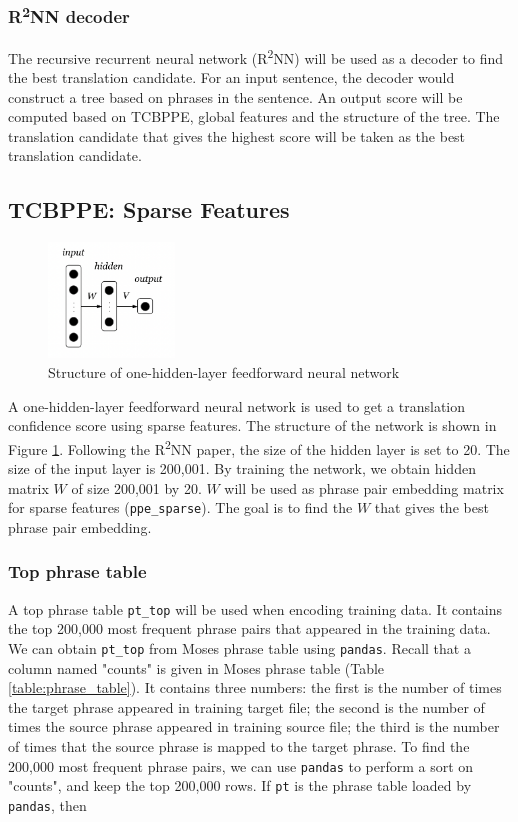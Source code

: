 \documentclass[12pt,a4paper,twoside,openright]{report}
\begin{document}
\subsubsection{R\textsuperscript{2}NN decoder}
The recursive recurrent neural network (R\textsuperscript{2}NN) will be used as a decoder to find the best translation candidate. For an input sentence, the decoder would construct a tree based on phrases in the sentence. An output score will be computed based on TCBPPE, global features and the structure of the tree. The translation candidate that gives the highest score will be taken as the best translation candidate.

\subsection{TCBPPE: Sparse Features} \label{TCBPPE_sparse}

\begin{figure}[ht]
\centering
\includegraphics[width=0.3\textwidth]{images/one_hidden_layer.png}
\caption{Structure of one-hidden-layer feedforward neural network}
\label{fig:one_hidden_layer}
\end{figure}

A one-hidden-layer feedforward neural network is used to get a translation confidence score using sparse features. The structure of the network is shown in Figure \ref{fig:one_hidden_layer}. Following the R\textsuperscript{2}NN paper\cite{r2nn}, the size of the hidden layer is set to 20. The size of the input layer is 200,001. By training the network, we obtain hidden matrix $W$ of size 200,001 by 20. $W$ will be used as phrase pair embedding matrix for sparse features (\texttt{ppe\_sparse}). The goal is to find the $W$ that gives the best phrase pair embedding.

\subsubsection{Top phrase table}
A top phrase table \texttt{pt\_top} will be used when encoding training data. It contains the top 200,000 most frequent phrase pairs that appeared in the training data. We can obtain \texttt{pt\_top} from Moses phrase table using \texttt{pandas}. Recall that a column named "counts" is given in Moses phrase table (Table \ref{table:phrase_table}). It contains three numbers: the first is the number of times the target phrase appeared in training target file; the second is the number of times the source phrase appeared in training source file; the third is the number of times that the source phrase is mapped to the target phrase. To find the 200,000 most frequent phrase pairs, we can use \texttt{pandas} to perform a sort on "counts", and keep the top 200,000 rows. If \texttt{pt} is the phrase table loaded by \texttt{pandas}, then
\end{document}
